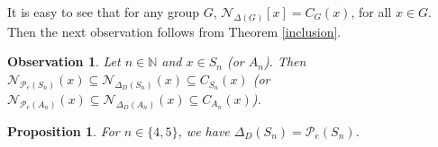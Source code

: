 \documentclass[12pt,a4paper]{article}
\newtheorem{proposition}[theorem]{Proposition}
\newtheorem{observation}[theorem]{Observation}
\begin{document}
It is easy to see that for any group $G$, $\mathcal{N}_{\Delta(G)}[x]=C_{G}(x)$, for all $x\in G$. Then the next observation follows from Theorem \ref{inclusion}.
\begin{observation}\label{deep commuting implies inside centralizer}
Let $n\in \mathbb{N}$ and $x\in S_n$ (or $A_n$). Then $\mathcal{N}_{\mathcal{P}_e(S_n)}(x)\subseteq \mathcal{N}_{\Delta_D(S_n)}(x)\subseteq C_{S_n}(x)$ (or $\mathcal{N}_{\mathcal{P}_e(A_n)}(x)\subseteq \mathcal{N}_{\Delta_D(A_n)}(x)\subseteq C_{A_n}(x)$).    
\end{observation}

\begin{proposition}\label{deep commuting of S_4,5}
For $n\in\{4,5\}$, we have $\Delta_D(S_n)=\mathcal{P}_e(S_n)$.
\end{proposition}
\end{document}
